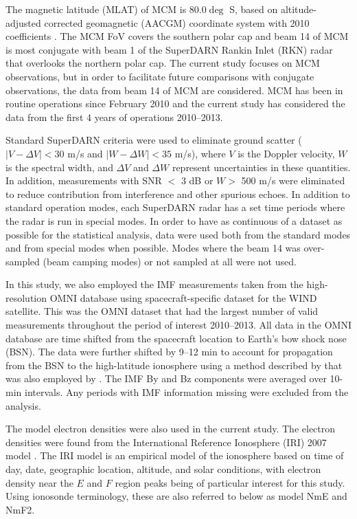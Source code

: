 The magnetic latitude (MLAT) of MCM is 80.0\(\deg\) S, based on altitude-adjusted corrected geomagnetic (AACGM) coordinate system with 2010 coefficients \citep[see recent paper by][]{Shepherd2014}. The MCM FoV covers the southern polar cap and beam 14 of MCM is most conjugate with beam 1 of the SuperDARN Rankin Inlet (RKN) radar that overlooks the northern polar cap. The current study focuses on MCM observations, but in order to facilitate future comparisons with conjugate observations, the data from beam 14 of MCM are considered. MCM has been in routine operations since February 2010 and the current study has considered the data from the first 4 years of operations 2010--2013.

Standard SuperDARN criteria were used to eliminate ground scatter (\(\left| V-\Delta V \right| <30\) m/s and \(\left| W-\Delta W \right| <35\) m/s), where \(V\) is the Doppler velocity, \(W\) is the spectral width, and \(\Delta V\) and \(\Delta W\) represent uncertainties in these quantities. In addition, measurements with SNR \(<\) 3 dB or \(W>\) 500 m/s were eliminated to reduce contribution from interference and other spurious echoes. In addition to standard operation modes, each SuperDARN radar has a set time periods where the radar is run in special modes. In order to have as continuous of a dataset as possible for the statistical analysis, data were used both from the standard modes and from special modes when possible. Modes where the beam 14 was over-sampled (beam camping modes) or not sampled at all were not used.

In this study, we also employed the IMF measurements taken from the high-resolution OMNI database using spacecraft-specific dataset for the WIND satellite. This was the OMNI dataset that had the largest number of valid measurements throughout the period of interest 2010--2013. All data in the OMNI database are time shifted from the spacecraft location to Earth's bow shock nose (BSN). The data were further shifted by 9--12 min to account for propagation from the BSN to the high-latitude ionosphere using a method described by \citet{Khan1999} that was also employed by \citet{Makarevich2012}. The IMF By and Bz components were averaged over 10-min intervals. Any periods with IMF information missing were excluded from the analysis.

The model electron densities were also used in the current study. The electron densities were found from the International Reference Ionosphere (IRI) 2007 model \citep{Bilitza2008}. The IRI model is an empirical model of the ionosphere based on time of day, date, geographic location, altitude, and solar conditions, with electron density near the \(E\) and \(F\) region peaks being of particular interest for this study.  Using ionosonde terminology, these are also referred to below as model NmE and NmF2.




